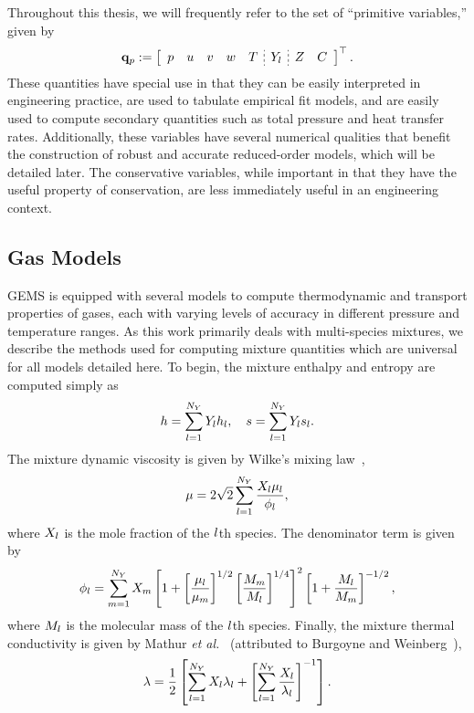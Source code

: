 Throughout this thesis, we will frequently refer to the set of ``primitive variables,'' given by
%
\begin{equation}\label{eq:gemsPrimVec}
    \primVec \defEq \left[
    \begin{array}{ccccc;{2pt/2pt}c;{2pt/2pt}cc}
    \pressure & \velX & \velY & \velZ & \temperature & \mfSpec & \mixFrac & \progVar
    \end{array}
    \right]^\top.
\end{equation}
%
These quantities have special use in that they can be easily interpreted in engineering practice, are used to tabulate empirical fit models, and are easily used to compute secondary quantities such as total pressure and heat transfer rates. Additionally, these variables have several numerical qualities that benefit the construction of robust and accurate reduced-order models, which will be detailed later. The conservative variables, while important in that they have the useful property of conservation, are less immediately useful in an engineering context.

\subsection{Gas Models}\label{subsec:gasModels}

GEMS is equipped with several models to compute thermodynamic and transport properties of gases, each with varying levels of accuracy in different pressure and temperature ranges. As this work primarily deals with multi-species mixtures, we describe the methods used for computing mixture quantities which are universal for all models detailed here. To begin, the mixture enthalpy and entropy are computed simply as
%
\begin{equation}
	h = \sum_{l = 1}^{N_Y} Y_{l} h_{l}, \quad s = \sum_{l = 1}^{N_Y} Y_{l} s_{l}.
\end{equation}
%
The mixture dynamic viscosity is given by Wilke's mixing law~\cite{Wilke1950},
%
\begin{equation}\label{eq:viscMix}
	\mu = 2 \sqrt{2} \sum_{l = 1}^{N_Y} \frac{X_{l} \mu_{l}}{\phi_{l}},
\end{equation}
%
where $X_{l}$ is the mole fraction of the $l$th species. The denominator term is given by
%
\begin{equation}\label{eq:viscMixDenom}
	\phi_{l} = \sum_{m = 1}^{N_Y} X_{m} \left[ 1 + \left[ \frac{\mu_{l}}{\mu_{m}} \right]^{1/2} \left[ \frac{M_{m}}{M_{l}} \right]^{1/4} \right]^2 \left[ 1 + \frac{M_{l}}{M_{m}} \right]^{-1/2},
\end{equation}
%
where $M_{l}$ is the molecular mass of the $l$th species. Finally, the mixture thermal conductivity is given by Mathur \textit{et al.}~\cite{Mathur1967} (attributed to Burgoyne and Weinberg~\cite{Burgoyne1952}),
%
\begin{equation}\label{eq:thermCondMix}
    \lambda = \frac{1}{2} \left[ \sum_{l = 1}^{N_Y} X_{l} \lambda_{l} + \left[\sum_{l = 1}^{N_Y} \frac{X_{l}}{\lambda_{l}} \right]^{-1} \right].
\end{equation}


